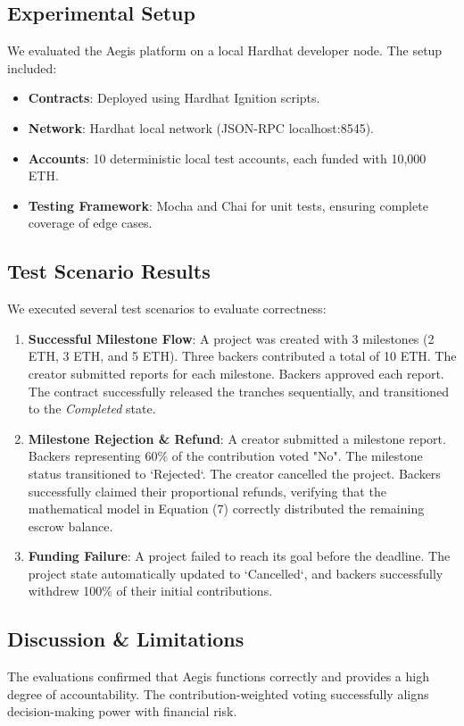 \documentclass[conference]{IEEEtran}
\begin{document}
\subsection{Experimental Setup}
We evaluated the Aegis platform on a local Hardhat developer node. The setup included:
\begin{itemize}
	\item \textbf{Contracts}: Deployed using Hardhat Ignition scripts.
	\item \textbf{Network}: Hardhat local network (JSON-RPC localhost:8545).
	\item \textbf{Accounts}: 10 deterministic local test accounts, each funded with 10,000 ETH.
	\item \textbf{Testing Framework}: Mocha and Chai for unit tests, ensuring complete coverage of edge cases.
\end{itemize}

\subsection{Test Scenario Results}
We executed several test scenarios to evaluate correctness:
\begin{enumerate}
	\item \textbf{Successful Milestone Flow}: A project was created with 3 milestones (2 ETH, 3 ETH, and 5 ETH). Three backers contributed a total of 10 ETH. The creator submitted reports for each milestone. Backers approved each report. The contract successfully released the tranches sequentially, and transitioned to the \textit{Completed} state.
	\item \textbf{Milestone Rejection \& Refund}: A creator submitted a milestone report. Backers representing 60\% of the contribution voted "No". The milestone status transitioned to `Rejected`. The creator cancelled the project. Backers successfully claimed their proportional refunds, verifying that the mathematical model in Equation (7) correctly distributed the remaining escrow balance.
	\item \textbf{Funding Failure}: A project failed to reach its goal before the deadline. The project state automatically updated to `Cancelled`, and backers successfully withdrew 100\% of their initial contributions.
\end{enumerate}

\subsection{Discussion \& Limitations}
The evaluations confirmed that Aegis functions correctly and provides a high degree of accountability. The contribution-weighted voting successfully aligns decision-making power with financial risk.
\end{document}
